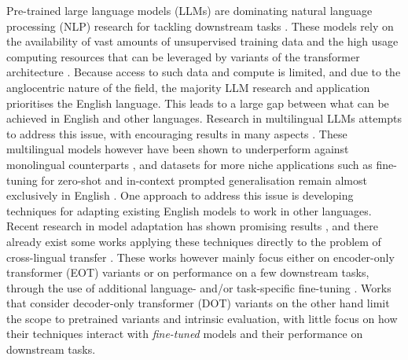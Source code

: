\documentclass[11pt]{article}
\begin{document}
Pre-trained large language models (LLMs) are dominating natural language processing (NLP) research
for tackling downstream tasks \citep{devlin_bert_2019,raffel_exploring_2020,brown_language_2020}.
These models rely on the availability of vast amounts of unsupervised training data and the high
usage computing resources that can be leveraged by variants of the transformer architecture
\citep{vaswani_attention_2017}. Because access to such data and compute is limited, and due to the
anglocentric nature of the field, the majority LLM research and application prioritises the English
language. This leads to a large gap between what can be achieved in English and other languages.
Research in multilingual LLMs attempts to address this issue, with encouraging results in many
aspects \citep{conneau_unsupervised_2020,bigscience_workshop_bloom_2022}. These multilingual models
however have been shown to underperform against monolingual counterparts \citep{wu_are_2020}, and
datasets for more niche applications such as fine-tuning for zero-shot and in-context prompted
generalisation remain almost exclusively in English
\citep{bach_promptsource_2022,mishra_cross-task_2022}. One approach to address this issue is
developing techniques for adapting existing English models to work in other languages. Recent
research in model adaptation has shown promising results
\citep{houlsby_parameter-efficient_2019,ainsworth_git_2022}, and there already exist some works
applying these techniques directly to the problem of cross-lingual transfer
\citep{artetxe_cross-lingual_2020}. These works however mainly focus either on encoder-only
transformer (EOT) variants or on performance on a few downstream tasks, through the use of
additional language- and/or task-specific fine-tuning
\citep{de_vries_adapting_2021,gogoulou_cross-lingual_2022}. Works that consider decoder-only
transformer (DOT) variants on the other hand \citep{de_vries_as_2021, minixhofer_wechsel_2022} limit
the scope to pretrained variants and intrinsic evaluation, with little focus on how their techniques
interact with \textit{fine-tuned} models and their performance on downstream tasks.
\end{document}
